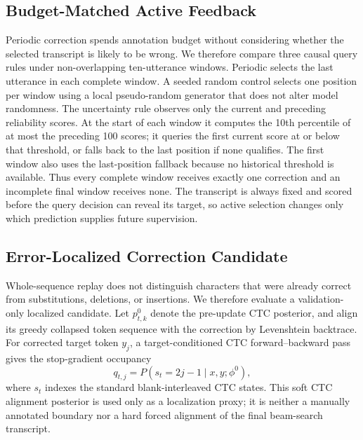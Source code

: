 \subsection{Budget-Matched Active Feedback}

Periodic correction spends annotation budget without considering whether the selected transcript is likely to be wrong. We therefore compare three causal query rules under non-overlapping ten-utterance windows. Periodic selects the last utterance in each complete window. A seeded random control selects one position per window using a local pseudo-random generator that does not alter model randomness. The uncertainty rule observes only the current and preceding reliability scores. At the start of each window it computes the 10th percentile of at most the preceding 100 scores; it queries the first current score at or below that threshold, or falls back to the last position if none qualifies. The first window also uses the last-position fallback because no historical threshold is available. Thus every complete window receives exactly one correction and an incomplete final window receives none. The transcript is always fixed and scored before the query decision can reveal its target, so active selection changes only which prediction supplies future supervision.

\subsection{Error-Localized Correction Candidate}

Whole-sequence replay does not distinguish characters that were already correct from substitutions, deletions, or insertions. We therefore evaluate a validation-only localized candidate. Let $p^0_{t,k}$ denote the pre-update CTC posterior, and align its greedy collapsed token sequence with the correction by Levenshtein backtrace. For corrected target token $y_j$, a target-conditioned CTC forward--backward pass gives the stop-gradient occupancy
\begin{equation}
  q_{t,j}=P(s_t=2j-1\mid x,y;\phi^0),
\end{equation}
where $s_t$ indexes the standard blank-interleaved CTC states. This soft CTC alignment posterior is used only as a localization proxy; it is neither a manually annotated boundary nor a hard forced alignment of the final beam-search transcript.


